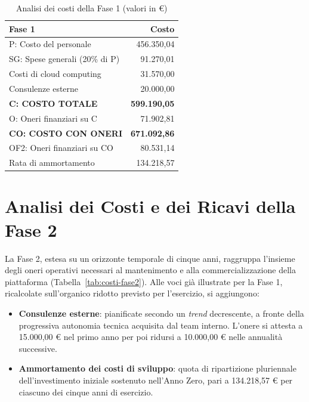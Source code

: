 \begin{table}[H]
\centering
\begin{tabular}{lr}
\hline
\textbf{Fase 1} & \textbf{Costo} \\
\hline
P: Costo del personale            & 456.350,04 \\
SG: Spese generali (20\% di P)    &  91.270,01 \\
Costi di cloud computing          &  31.570,00 \\
Consulenze esterne                &  20.000,00 \\
\hline
\textbf{C: COSTO TOTALE}          & \textbf{599.190,05} \\
O: Oneri finanziari su C          &  71.902,81 \\
\textbf{CO: COSTO CON ONERI}      & \textbf{671.092,86} \\
OF2: Oneri finanziari su CO       &  80.531,14 \\
Rata di ammortamento              & 134.218,57 \\
\hline
\end{tabular}
\caption{Analisi dei costi della Fase 1 (valori in \euro)}
\label{tab:costi-fase1}
\end{table}

\section{Analisi dei Costi e dei Ricavi della Fase 2}

La Fase 2, estesa su un orizzonte temporale di cinque anni, raggruppa l'insieme degli oneri operativi necessari al mantenimento e alla commercializzazione della piattaforma (Tabella~\ref{tab:costi-fase2}). Alle voci gi\`a illustrate per la Fase 1, ricalcolate sull'organico ridotto previsto per l'esercizio, si aggiungono:

\begin{itemize}
    \item \textbf{Consulenze esterne}: pianificate secondo un \textit{trend} decrescente, a fronte della progressiva autonomia tecnica acquisita dal team interno. L'onere si attesta a 15.000,00 \euro{} nel primo anno per poi ridursi a 10.000,00 \euro{} nelle annualit\`a successive.
    \item \textbf{Ammortamento dei costi di sviluppo}: quota di ripartizione pluriennale dell'investimento iniziale sostenuto nell'Anno Zero, pari a 134.218,57 \euro{} per ciascuno dei cinque anni di esercizio.
\end{itemize}

